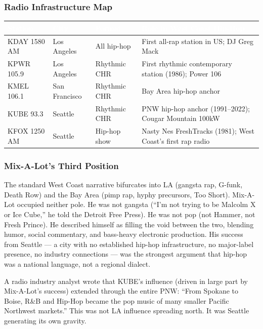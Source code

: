 \documentclass[11pt,letterpaper]{article}
\newcommand{\tableheader}[1]{\textbf{\sffamily\textcolor{white}{#1}}}
\begin{document}
\subsubsection{Radio Infrastructure Map}

\begin{center}
\begin{tabularx}{\textwidth}{L{2.5cm}L{2cm}L{2cm}X}
\toprule
{}
\tableheader{Station} & \tableheader{City} & \tableheader{Format} & \tableheader{Role in West Coast Hip-Hop} \\
\midrule
KDAY 1580 AM & Los Angeles & All hip-hop & First all-rap station in US; DJ Greg Mack \\
KPWR 105.9 & Los Angeles & Rhythmic CHR & First rhythmic contemporary station (1986); Power 106 \\
KMEL 106.1 & San Francisco & Rhythmic CHR & Bay Area hip-hop anchor \\
KUBE 93.3 & Seattle & Rhythmic CHR & PNW hip-hop anchor (1991--2022); Cougar Mountain 100kW \\
KFOX 1250 AM & Seattle & Hip-hop show & Nasty Nes FreshTracks (1981); West Coast's first rap radio \\
\bottomrule
\end{tabularx}
\end{center}

\subsubsection{Mix-A-Lot's Third Position}
The standard West Coast narrative bifurcates into LA (gangsta rap, G-funk, Death Row) and the Bay Area (pimp rap, hyphy precursors, Too Short). Mix-A-Lot occupied neither pole. He was not gangsta (``I'm not trying to be Malcolm X or Ice Cube,'' he told the Detroit Free Press). He was not pop (not Hammer, not Fresh Prince). He described himself as filling the void between the two, blending humor, social commentary, and bass-heavy electronic production. His success from Seattle --- a city with no established hip-hop infrastructure, no major-label presence, no industry connections --- was the strongest argument that hip-hop was a national language, not a regional dialect.

A radio industry analyst wrote that KUBE's influence (driven in large part by Mix-A-Lot's success) extended through the entire PNW: ``From Spokane to Boise, R\&B and Hip-Hop became the pop music of many smaller Pacific Northwest markets.'' This was not LA influence spreading north. It was Seattle generating its own gravity.
\end{document}
